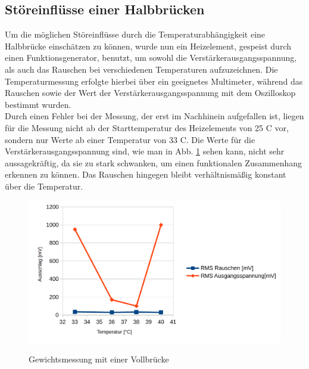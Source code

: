 \subsection{Störeinflüsse einer Halbbrücken}
Um die möglichen Störeinflüsse durch die Temperaturabhängigkeit eine Halbbrücke einschätzen zu können, wurde nun ein Heizelement, gespeist durch einen Funktionsgenerator, benutzt, um sowohl die Verstärkerausgangsspannung, als auch das Rauschen bei verschiedenen Temperaturen aufzuzeichnen. Die Temperaturmessung erfolgte hierbei über ein geeignetes Multimeter, während das Rauschen sowie der Wert der Verstärkerausgangsspannung mit dem Oszilloskop bestimmt wurden. \\
Durch einen Fehler bei der Messung, der erst im Nachhinein aufgefallen ist, liegen für die Messung nicht ab der Starttemperatur des Heizelements von 25 C vor, sondern nur Werte ab einer Temperatur von 33  C. Die Werte für die Verstärkerausgangsspannung sind, wie man in Abb. \ref{fig:temp_mb} sehen kann, nicht sehr aussagekräftig, da sie zu stark schwanken, um einen funktionalen Zusammenhang erkennen zu können. Das Rauschen hingegen bleibt verhältnismäßig konstant über die Temperatur.
\begin{figure}[H]
	\centering
	\includegraphics[width=\textwidth]{./img/ch3/TemperaturmessungHalbbruecke_3_3_2.png}
	\label{fig:temp_mb}
	\caption{Gewichtsmessung mit einer Vollbrücke}
\end{figure}

